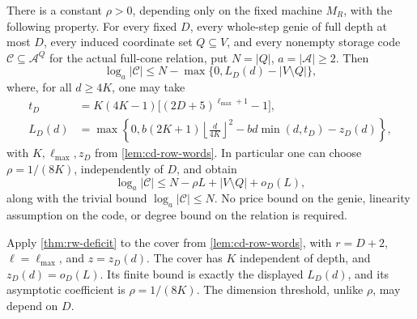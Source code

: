 \begin{theorem}
\label{thm:cd-uniform-gap}
There is a constant $\rho>0$, depending only on the fixed machine $M_R$,
with the following property.  For every fixed $D$, every whole-step genie
of full depth at most $D$, every induced coordinate set $Q\subseteq V$,
and every nonempty storage code $\mathcal C\subseteq\mathcal A^Q$ for
the actual full-cone relation, put $N=|Q|$, $a=|\mathcal A|\ge2$.
Then
\[
 \log_a|\mathcal C|
 \le N-\max\{0,L_D(d)-|V\setminus Q|\},
\]
where, for all $d\ge4K$, one may take
\[
 \begin{split}
 t_D&=K(4K-1)\bigl[(2D+5)^{\ell_{\max}+1}-1\bigr],\\
 L_D(d)&=\max\left\{0,
 b(2K+1)\left\lfloor\frac d{4K}\right\rfloor^2
                    -bd\min(d,t_D)-z_D(d)\right\},
 \end{split}
\]
with $K,\ell_{\max},z_D$ from \cref{lem:cd-row-words}.  In particular one can
choose $\rho=1/(8K)$, independently of $D$, and obtain
\[
 \log_a|\mathcal C|
 \le N-\rho L+|V\setminus Q|+o_D(L),
\]
along with the trivial bound $\log_a|\mathcal C|\le N$.
No price bound on the genie, linearity assumption on the code, or degree
bound on the relation is required.
\end{theorem}

\begin{informalproof}
Apply \cref{thm:rw-deficit} to the cover from \cref{lem:cd-row-words},
with $r=D+2$, $\ell=\ell_{\max}$, and $z=z_D(d)$.
The cover has $K$ independent of depth, and $z_D(d)=o_D(L)$.
Its finite bound is exactly the displayed $L_D(d)$, and its asymptotic
coefficient is $\rho=1/(8K)$. The dimension threshold, unlike $\rho$,
may depend on $D$.
\end{informalproof}

